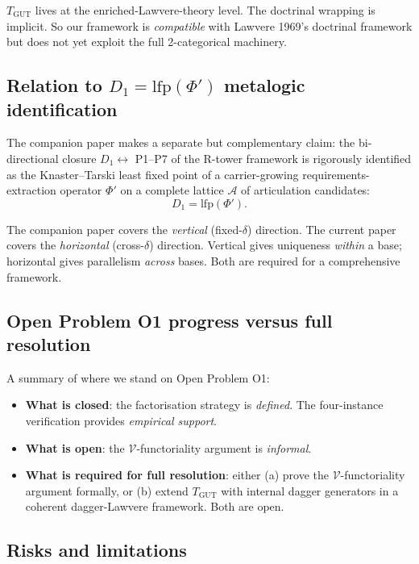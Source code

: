 \documentclass[11pt,a4paper]{article}
\theoremstyle{plain}
\theoremstyle{definition}
\theoremstyle{remark}
\newcommand{\lfp}{\mathrm{lfp}}
\newcommand{\TGUT}{T_{\mathrm{GUT}}}
\begin{document}
$\TGUT$ lives at the enriched-Lawvere-theory level. The doctrinal wrapping is implicit. So our framework is \emph{compatible} with Lawvere 1969's doctrinal framework but does not yet exploit the full 2-categorical machinery.

\subsection{Relation to $D_1 = \lfp(\Phi')$ metalogic identification}\label{sec:disc:lfp}

The companion paper makes a separate but complementary claim: the bi-directional closure $D_1 \longleftrightarrow$ P1--P7 of the R-tower framework is rigorously identified as the Knaster--Tarski least fixed point of a carrier-growing requirements-extraction operator $\Phi'$ on a complete lattice $\mathcal{A}$ of articulation candidates:
\[
D_1 = \lfp(\Phi').
\]

The companion paper covers the \emph{vertical} (fixed-$\delta$) direction. The current paper covers the \emph{horizontal} (cross-$\delta$) direction. Vertical gives uniqueness \emph{within} a base; horizontal gives parallelism \emph{across} bases. Both are required for a comprehensive framework.

\subsection{Open Problem O1 progress versus full resolution}\label{sec:disc:o1}

A summary of where we stand on Open Problem O1:

\begin{itemize}[leftmargin=*]
\item \textbf{What is closed}: the factorisation strategy is \emph{defined}. The four-instance verification provides \emph{empirical support}.
\item \textbf{What is open}: the $\mathcal{V}$-functoriality argument is \emph{informal}.
\item \textbf{What is required for full resolution}: either (a) prove the $\mathcal{V}$-functoriality argument formally, or (b) extend $\TGUT$ with internal dagger generators in a coherent dagger-Lawvere framework. Both are open.
\end{itemize}

\subsection{Risks and limitations}\label{sec:disc:risks}
\end{document}
